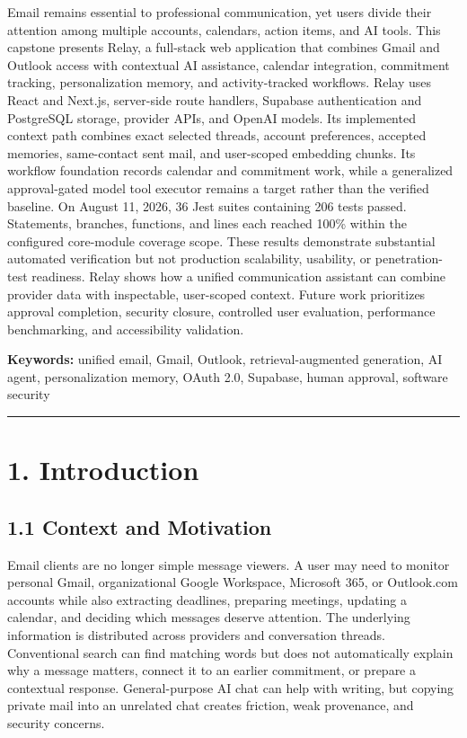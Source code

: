 \documentclass[
]{report}
\begin{document}
Email remains essential to professional communication, yet users divide
their attention among multiple accounts, calendars, action items, and AI
tools. This capstone presents Relay, a full-stack web application that
combines Gmail and Outlook access with contextual AI assistance,
calendar integration, commitment tracking, personalization memory, and
activity-tracked workflows. Relay uses React and Next.js, server-side
route handlers, Supabase authentication and PostgreSQL storage, provider
APIs, and OpenAI models. Its implemented context path combines exact
selected threads, account preferences, accepted memories, same-contact
sent mail, and user-scoped embedding chunks. Its workflow foundation
records calendar and commitment work, while a generalized
approval-gated model tool executor remains a target rather than the
verified baseline. On August 11, 2026, 36 Jest suites containing 206 tests
passed. Statements, branches, functions, and lines each reached 100\%
within the configured core-module coverage scope. These
results demonstrate substantial automated verification but not
production scalability, usability, or penetration-test readiness. Relay
shows how a unified communication assistant can combine provider data
with inspectable, user-scoped context. Future work prioritizes approval
completion, security closure, controlled user evaluation, performance
benchmarking, and accessibility validation.

\textbf{Keywords:} unified email, Gmail, Outlook, retrieval-augmented
generation, AI agent, personalization memory, OAuth 2.0, Supabase, human
approval, software security

\begin{center}\rule{0.5\linewidth}{0.5pt}\end{center}

\chapter{1. Introduction}\label{1-introduction}

\section{1.1 Context and Motivation}\label{11-context-and-motivation}

Email clients are no longer simple message viewers. A user may need to
monitor personal Gmail, organizational Google Workspace, Microsoft 365,
or Outlook.com accounts while also extracting deadlines, preparing
meetings, updating a calendar, and deciding which messages deserve
attention. The underlying information is distributed across providers
and conversation threads. Conventional search can find matching words
but does not automatically explain why a message matters, connect it to
an earlier commitment, or prepare a contextual response. General-purpose
AI chat can help with writing, but copying private mail into an
unrelated chat creates friction, weak provenance, and security concerns.
\end{document}
